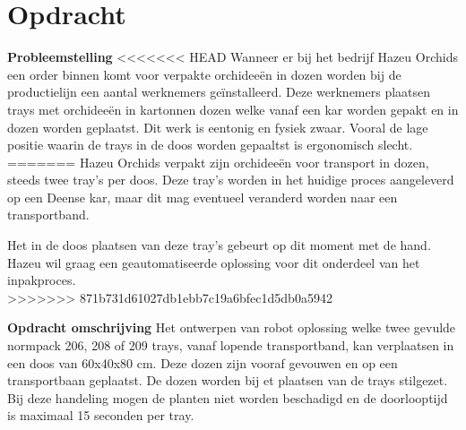 \section{Opdracht}
	\textbf{Probleemstelling}
<<<<<<< HEAD
	Wanneer er bij het bedrijf Hazeu Orchids een order binnen komt voor verpakte orchideeën in dozen worden bij de productielijn een aantal werknemers geïnstalleerd. Deze werknemers plaatsen trays met orchideeën in kartonnen dozen welke vanaf een kar worden gepakt en in dozen worden geplaatst. Dit werk is eentonig en fysiek zwaar. Vooral de lage positie waarin de trays in de doos worden gepaaltst is ergonomisch slecht.
	\vspace{5mm}
=======
	Hazeu Orchids verpakt zijn orchideeën voor transport in dozen, steeds twee tray's per doos. Deze tray's worden in het huidige proces aangeleverd op een Deense kar, maar dit mag eventueel veranderd worden naar een transportband.\newline
	
	Het in de doos plaatsen van deze tray's gebeurt op dit moment met de hand. Hazeu wil graag een geautomatiseerde oplossing voor dit onderdeel van het inpakproces.\\[0.5cm]
	
	
>>>>>>> 871b731d61027db1ebb7c19a6bfec1d5db0a5942
	
	\textbf{Opdracht omschrijving}
	Het ontwerpen van robot oplossing welke twee gevulde normpack  206, 208 of 209 trays, vanaf lopende transportband, kan verplaatsen in een doos van 60x40x80 cm. Deze dozen zijn vooraf gevouwen en op een transportbaan geplaatst. De dozen worden bij et plaatsen van de trays stilgezet. Bij deze handeling mogen de planten niet worden beschadigd en de doorlooptijd is maximaal 15 seconden per tray.
	
	
\newpage
